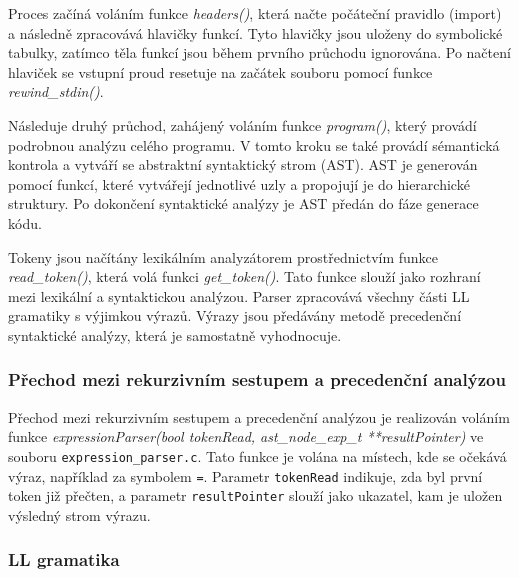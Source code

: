 \documentclass[a4paper, 12pt]{article}
\begin{document}
Proces začíná voláním funkce \textit{headers()}, která načte počáteční pravidlo (import) a následně zpracovává hlavičky funkcí. Tyto hlavičky jsou uloženy do symbolické tabulky, zatímco těla funkcí jsou během prvního průchodu ignorována. Po načtení hlaviček se vstupní proud resetuje na začátek souboru pomocí funkce \textit{rewind\_stdin()}.

Následuje druhý průchod, zahájený voláním funkce \textit{program()}, který provádí podrobnou analýzu celého programu. V tomto kroku se také provádí sémantická kontrola a vytváří se abstraktní syntaktický strom (AST). AST je generován pomocí funkcí, které vytvářejí jednotlivé uzly a propojují je do hierarchické struktury. Po dokončení syntaktické analýzy je AST předán do fáze generace kódu.

Tokeny jsou načítány lexikálním analyzátorem prostřednictvím funkce \textit{read\_token()}, která volá funkci \textit{get\_token()}. Tato funkce slouží jako rozhraní mezi lexikální a syntaktickou analýzou. Parser zpracovává všechny části LL gramatiky s výjimkou výrazů. Výrazy jsou předávány metodě precedenční syntaktické analýzy, která je samostatně vyhodnocuje.

\subsubsection{Přechod mezi rekurzivním sestupem a precedenční analýzou}
Přechod mezi rekurzivním sestupem a precedenční analýzou je realizován voláním funkce \textit{expressionParser(bool tokenRead, ast\_node\_exp\_t **resultPointer)} ve souboru \texttt{expression\_parser.c}. Tato funkce je volána na místech, kde se očekává výraz, například za symbolem \texttt{=}. Parametr \texttt{tokenRead} indikuje, zda byl první token již přečten, a parametr \texttt{resultPointer} slouží jako ukazatel, kam je uložen výsledný strom výrazu.

\vspace{4cm}

\newpage

\subsubsection{LL gramatika}
\end{document}
